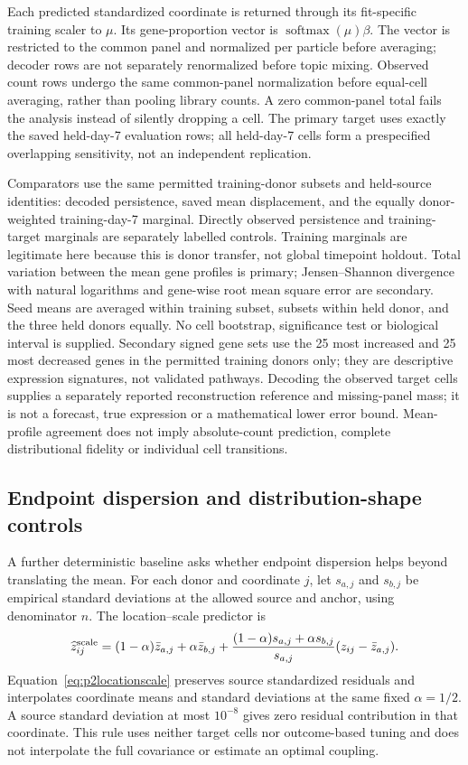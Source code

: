 \documentclass[10pt,a4paper]{article}
\begin{document}
Each predicted standardized coordinate is returned through its fit-specific training scaler to $\mu$. Its gene-proportion vector is $\operatorname{softmax}(\mu)\beta$. The vector is restricted to the common panel and normalized per particle before averaging; decoder rows are not separately renormalized before topic mixing. Observed count rows undergo the same common-panel normalization before equal-cell averaging, rather than pooling library counts. A zero common-panel total fails the analysis instead of silently dropping a cell. The primary target uses exactly the saved held-day-7 evaluation rows; all held-day-7 cells form a prespecified overlapping sensitivity, not an independent replication.

Comparators use the same permitted training-donor subsets and held-source identities: decoded persistence, saved mean displacement, and the equally donor-weighted training-day-7 marginal. Directly observed persistence and training-target marginals are separately labelled controls. Training marginals are legitimate here because this is donor transfer, not global timepoint holdout. Total variation between the mean gene profiles is primary; Jensen--Shannon divergence with natural logarithms and gene-wise root mean square error are secondary. Seed means are averaged within training subset, subsets within held donor, and the three held donors equally. No cell bootstrap, significance test or biological interval is supplied. Secondary signed gene sets use the 25 most increased and 25 most decreased genes in the permitted training donors only; they are descriptive expression signatures, not validated pathways. Decoding the observed target cells supplies a separately reported reconstruction reference and missing-panel mass; it is not a forecast, true expression or a mathematical lower error bound. Mean-profile agreement does not imply absolute-count prediction, complete distributional fidelity or individual cell transitions.

\subsection{Endpoint dispersion and distribution-shape controls}
A further deterministic baseline asks whether endpoint dispersion helps beyond translating the mean. For each donor and coordinate $j$, let $s_{a,j}$ and $s_{b,j}$ be empirical standard deviations at the allowed source and anchor, using denominator $n$. The location--scale predictor is
\begin{equation}
\widehat z_{ij}^{\rm scale}=(1-\alpha)\bar z_{a,j}+\alpha\bar z_{b,j}
+\frac{(1-\alpha)s_{a,j}+\alpha s_{b,j}}{s_{a,j}}(z_{ij}-\bar z_{a,j}).\label{eq:p2locationscale}
\end{equation}
Equation~\eqref{eq:p2locationscale} preserves source standardized residuals and interpolates coordinate means and standard deviations at the same fixed $\alpha=1/2$. A source standard deviation at most $10^{-8}$ gives zero residual contribution in that coordinate. This rule uses neither target cells nor outcome-based tuning and does not interpolate the full covariance or estimate an optimal coupling.
\end{document}
